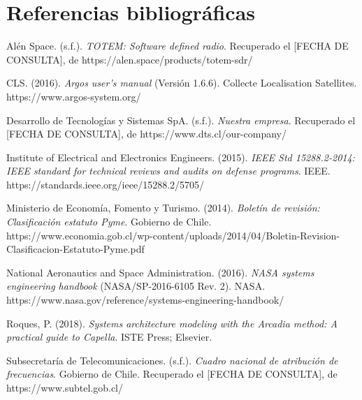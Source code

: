 \indent
\section{Referencias bibliográficas}
\leftskip 0.3in
\parindent -0.3in

%
%
%

Alén Space. (s.f.). \textit{TOTEM: Software defined radio}. Recuperado el
[FECHA DE CONSULTA], de https://alen.space/products/totem-sdr/

CLS. (2016). \textit{Argos user's manual} (Versión 1.6.6). Collecte Localisation
Satellites. https://www.argos-system.org/

Desarrollo de Tecnologías y Sistemas SpA. (s.f.). \textit{Nuestra empresa}.
Recuperado el [FECHA DE CONSULTA], de https://www.dts.cl/our-company/

Institute of Electrical and Electronics Engineers. (2015). \textit{IEEE Std
15288.2-2014: IEEE standard for technical reviews and audits on defense
programs}. IEEE. https://standards.ieee.org/ieee/15288.2/5705/

Ministerio de Economía, Fomento y Turismo. (2014). \textit{Boletín de revisión:
Clasificación estatuto Pyme}. Gobierno de Chile.
https://www.economia.gob.cl/wp-content/uploads/2014/04/Boletin-Revision-Clasificacion-Estatuto-Pyme.pdf

National Aeronautics and Space Administration. (2016). \textit{NASA systems
engineering handbook} (NASA/SP-2016-6105 Rev. 2). NASA.
https://www.nasa.gov/reference/systems-engineering-handbook/

Roques, P. (2018). \textit{Systems architecture modeling with the Arcadia method:
A practical guide to Capella}. ISTE Press; Elsevier.

Subsecretaría de Telecomunicaciones. (s.f.). \textit{Cuadro nacional de
atribución de frecuencias}. Gobierno de Chile. Recuperado el [FECHA DE CONSULTA],
de https://www.subtel.gob.cl/
